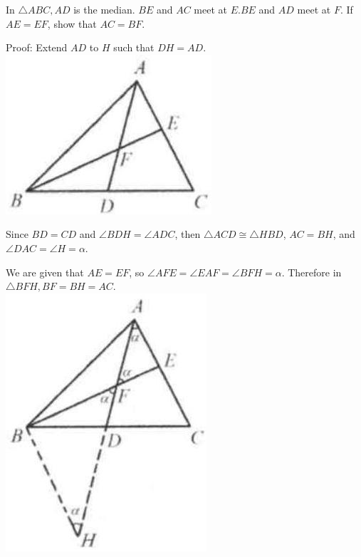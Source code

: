 \documentclass{article}
\begin{document}
In \(\triangle A B C, A D\) is the median. \(B E\) and \(A C\) meet at \(E . B E\) and \(A D\) meet at \(F\). If \(A E=E F\), show that \(A C=B F\).

Proof:
Extend \(A D\) to \(H\) such that \(D H=A D\).\\
\centering
\includegraphics[width=\textwidth]{images/026.jpg}

Since \(B D=C D\) and \(\angle B D H=\angle A D C\), then \(\triangle A C D \cong \triangle H B D\), \(A C=B H\), and \(\angle D A C=\angle H=\alpha\).

We are given that \(A E=E F\), so \(\angle A F E=\angle E A F=\angle B F H=\alpha\). Therefore in \(\triangle B F H, B F=B H=A C\).\\
\centering
\includegraphics[width=\textwidth]{images/026(1).jpg}
\end{document}
